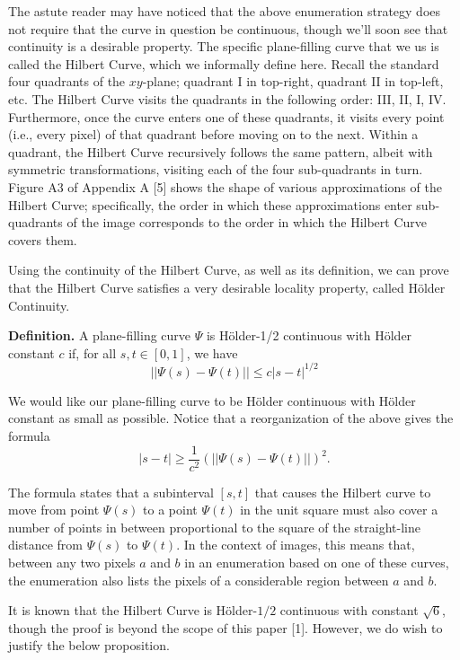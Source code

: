 \documentclass[twoside]{article}
\begin{document}
\begin{multicols}{2}
The astute reader may have noticed that the above enumeration strategy does not require that the curve in question be continuous, though we'll soon see that continuity is a desirable property. The specific plane-filling curve that we us is called the Hilbert Curve, which we informally define here. Recall the standard four quadrants of the $xy$-plane; quadrant I in top-right, quadrant II in top-left, etc. The Hilbert Curve visits the quadrants in the following order: III, II, I, IV. Furthermore, once the curve enters one of these quadrants, it visits every point (i.e., every pixel) of that quadrant before moving on to the next. Within a quadrant, the Hilbert Curve recursively follows the same pattern, albeit with symmetric transformations, visiting each of the four sub-quadrants in turn. Figure A3 of Appendix A [5] shows the shape of various approximations of the Hilbert Curve; specifically, the order in which these approximations enter sub-quadrants of the image corresponds to the order in which the Hilbert Curve covers them.

Using the continuity of the Hilbert Curve, as well as its definition, we can prove that the Hilbert Curve satisfies a very desirable locality property, called H\"older Continuity.

\vspace{0.5em}
\noindent \textbf{Definition. } A plane-filling curve $\Psi$ is H\"older-1/2 continuous with H\"older constant $c$ if, for all $s, t \in [0, 1]$, we have
\[
||\Psi(s) - \Psi(t)|| \leq c | s - t |^{1/2}
\]

We would like our plane-filling curve to be H\"older continuous with H\"older constant as small as possible. Notice that a reorganization of the above gives the formula
\[
|s - t| \geq \frac{1}{c^2} (||\Psi(s) - \Psi(t)||)^2.
\]

The formula states that a subinterval $[s, t]$ that causes the Hilbert curve to move from point $\Psi(s)$ to a point $\Psi(t)$ in the unit square must also cover a number of points in between proportional to the square of the straight-line distance from $\Psi(s)$ to $\Psi(t)$. In the context of images, this means that, between any two pixels $a$ and $b$ in an enumeration based on one of these curves, the enumeration also lists the pixels of a considerable region between $a$ and $b$.

It is known that the Hilbert Curve is H\"older-$1/2$ continuous with constant $\sqrt{6}$, though the proof is beyond the scope of this paper [1]. However, we do wish to justify the below proposition. 


\end{multicols}
\end{document}
